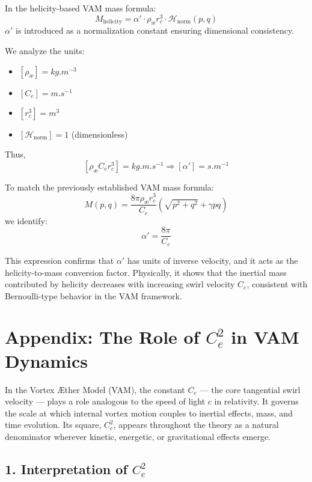 \documentclass[a4paper, aps,preprint,superscriptaddress, 12pt]{revtex4}
\begin{document}
In the helicity-based VAM mass formula:
\[
    M_{\text{helicity}} = \alpha' \cdot \rho_\text{\ae} r_c^3 \cdot \mathcal{H}_{\text{norm}}(p,q)
\]
\( \alpha' \) is introduced as a normalization constant ensuring dimensional consistency.

We analyze the units:
\begin{itemize}
    \item \( [\rho_\text{\ae}] = \si{kg.m^{-3}} \)
    \item \( [C_e] = \si{m.s^{-1}} \)
    \item \( [r_c^3] = \si{m^3} \)
    \item \( [\mathcal{H}_{\text{norm}}] = 1 \) (dimensionless)
\end{itemize}
Thus,
\[
    [\rho_\text{\ae} C_e r_c^3] = \si{kg.m.s^{-1}} \Rightarrow [\alpha'] = \si{s.m^{-1}}
\]

To match the previously established VAM mass formula:
\[
    M(p, q) = \frac{8\pi \rho_\text{\ae} r_c^3}{C_e} \left( \sqrt{p^2 + q^2} + \gamma pq \right)
\]
we identify:
\[
    \boxed{\alpha' = \frac{8\pi}{C_e}}
\]

This expression confirms that \( \alpha' \) has units of inverse velocity, and it acts as the helicity-to-mass conversion factor. Physically, it shows that the inertial mass contributed by helicity decreases with increasing swirl velocity \( C_e \), consistent with Bernoulli-type behavior in the VAM framework.

\appendix

\section*{Appendix: The Role of \( C_e^2 \) in VAM Dynamics}

In the Vortex Æther Model (VAM), the constant \( C_e \) --- the core tangential swirl velocity --- plays a role analogous to the speed of light \( c \) in relativity. It governs the scale at which internal vortex motion couples to inertial effects, mass, and time evolution. Its square, \( C_e^2 \), appears throughout the theory as a natural denominator wherever kinetic, energetic, or gravitational effects emerge.

\subsection*{1. Interpretation of \( C_e^2 \)}
\end{document}
